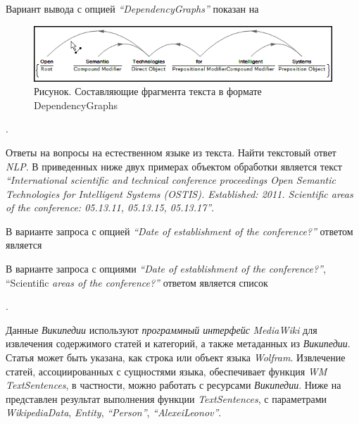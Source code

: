 Вариант вывода с опцией \textit{``DependencyGraphs''} показан на \textit{}
\begin{figure}[H]
	\includegraphics[scale=0.71]{images/part7/chapter_integration/integr_alg5.png}
	\caption{Рисунок. Составляющие фрагмента текста в формате DependencyGraphs}
	\label{fig:integr_alg5}
\end{figure}

.

Ответы на вопросы на естественном языке из текста. Найти текстовый ответ \textit{NLP}. 
В приведенных ниже двух примерах объектом обработки является текст \textit{``International scientific and technical conference proceedings Open Semantic Technologies for Intelligent Systems (OSTIS). Established: 2011. Scientific areas of the conference: 05.13.11, 05.13.15, 05.13.17''}.

В варианте запроса с опцией \textit{``Date of establishment of the conference?''} ответом является
\begin{center}
\end{center}
В варианте запроса с опциями \textit{``Date of establishment of the conference?''}, ``Scientific \textit{areas of the conference?''} ответом является список 
\begin{center}
\end{center}

.

Данные \textit{Википедии} используют \textit{программный интерфейс} \textit{MediaWiki} для извлечения содержимого статей и категорий, а также метаданных из \textit{Википедии}. Статья может быть указана, как строка или объект языка \textit{Wolfram}. 
Извлечение статей, ассоциированных с сущностями языка, обеспечивает функция \textit{WM} \textit{TextSentences}, в частности, можно работать с ресурсами \textit{Википедии}. 
Ниже на \textit{} представлен результат выполнения функции \textit{TextSentences}, с параметрами \textit{WikipediaData}, \textit{Entity}, \textit{``Person''}, \textit{``AlexeiLeonov''}.
 
